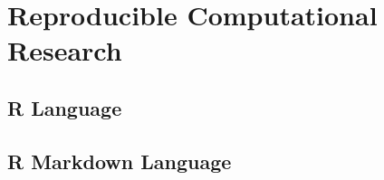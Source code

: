 \documentclass[b5paper,oneside,british,intoc,bibliograph=totoc,index=totoc,BCOR10mm,twoside,openright]{book}
\numberwithin{equation}{section}
\numberwithin{figure}{section}
\begin{document}
\chapter{Reproducible Computational Research}

\begin{appendices}
\section{R Language}
\section{R Markdown Language}
%
%
%
\end{appendices}

%
%
%
%
%
%

%
%
%


\printbibliography[heading=bibnumbered]
\cleardoublepage

\printglossaries

\cleardoublepage
{}
\listoffigures

\cleardoublepage
{}
\listoftables

\end{document}
